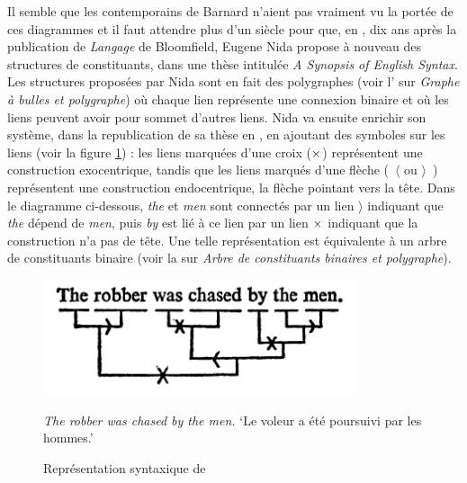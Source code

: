 {    Il semble que les contemporains de Barnard n’aient pas vraiment vu la portée de ces diagrammes et il faut attendre plus d’un siècle pour que, en \citeyear{nida1943morphology}, dix ans après la publication de \textit{Langage} de Bloomfield, Eugene Nida propose à nouveau des structures de constituants, dans une thèse intitulée \textit{A Synopsis of English Syntax}. Les structures proposées par Nida sont en fait des polygraphes (voir l’ sur \textit{Graphe à bulles et polygraphe}) où chaque lien représente une connexion binaire et où les liens peuvent avoir pour sommet d’autres liens. Nida va ensuite enrichir son système, dans la republication de sa thèse en \citeyear{nida1966synopsys}, en ajoutant des symboles sur les liens (voir la figure \ref{fig:nida}) : les liens marquées d’une croix ($\large\times$)
    représentent une construction exocentrique, tandis que les liens marqués d’une flèche (~$\langle$ ou $\rangle$~) représentent une construction endocentrique, la flèche pointant vers la tête. Dans le diagramme ci-dessous, \textit{the} et \textit{men} sont connectés par un lien $\rangle$ indiquant que \textit{the} dépend de \textit{men}, puis \textit{by} est lié à ce lien par un lien $\large\times$ indiquant que la construction n’a pas de tête. Une telle représentation est équivalente à un arbre de constituants binaire (voir la  sur \textit{Arbre de constituants binaires et polygraphe}).

    \begin{figure}[H]
        \includegraphics[width=\textwidth]{figures/vol1syntaxe2-img023.png}
        \caption{Représentation syntaxique de \citet{nida1966synopsys}}
        \label{fig:nida}
        \small\textit{The robber was chased by the men.} ‘Le voleur a été poursuivi par les hommes.’
    \end{figure}
     
}
